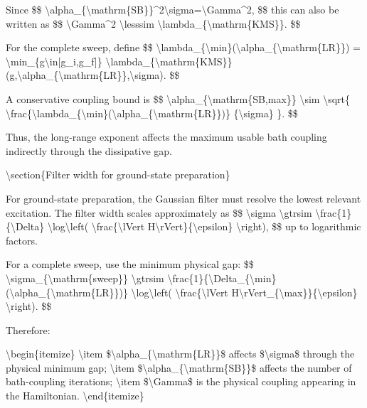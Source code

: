 {Since
\$\$
\textbackslash{}alpha\_\{\textbackslash{}mathrm\{SB\}\}\textasciicircum{}2\textbackslash{}sigma=\textbackslash{}Gamma\textasciicircum{}2,
\$\$
this can also be written as
\$\$
\textbackslash{}Gamma\textasciicircum{}2
\textbackslash{}lesssim
\textbackslash{}lambda\_\{\textbackslash{}mathrm\{KMS\}\}.
\$\$

For the complete sweep, define
\$\$
\textbackslash{}lambda\_\{\textbackslash{}min\}(\textbackslash{}alpha\_\{\textbackslash{}mathrm\{LR\}\})
=
\textbackslash{}min\_\{g\textbackslash{}in[g\_i,g\_f]\}
\textbackslash{}lambda\_\{\textbackslash{}mathrm\{KMS\}\}
(g,\textbackslash{}alpha\_\{\textbackslash{}mathrm\{LR\}\},\textbackslash{}sigma).
\$\$

A conservative coupling bound is
\$\$
\textbackslash{}alpha\_\{\textbackslash{}mathrm\{SB,max\}\}
\textbackslash{}sim
\textbackslash{}sqrt\{
\textbackslash{}frac\{\textbackslash{}lambda\_\{\textbackslash{}min\}(\textbackslash{}alpha\_\{\textbackslash{}mathrm\{LR\}\})\}
\{\textbackslash{}sigma\}
\}.
\$\$

Thus, the long-range exponent affects the maximum usable bath coupling
indirectly through the dissipative gap.

\textbackslash{}section\{Filter width for ground-state preparation\}

For ground-state preparation, the Gaussian filter must resolve the lowest
relevant excitation. The filter width scales approximately as
\$\$
\textbackslash{}sigma
\textbackslash{}gtrsim
\textbackslash{}frac\{1\}\{\textbackslash{}Delta\}
\textbackslash{}log\textbackslash{}left(
\textbackslash{}frac\{\textbackslash{}lVert H\textbackslash{}rVert\}\{\textbackslash{}epsilon\}
\textbackslash{}right),
\$\$
up to logarithmic factors.

For a complete sweep, use the minimum physical gap:
\$\$
\textbackslash{}sigma\_\{\textbackslash{}mathrm\{sweep\}\}
\textbackslash{}gtrsim
\textbackslash{}frac\{1\}\{\textbackslash{}Delta\_\{\textbackslash{}min\}(\textbackslash{}alpha\_\{\textbackslash{}mathrm\{LR\}\})\}
\textbackslash{}log\textbackslash{}left(
\textbackslash{}frac\{\textbackslash{}lVert H\textbackslash{}rVert\_\{\textbackslash{}max\}\}\{\textbackslash{}epsilon\}
\textbackslash{}right).
\$\$

Therefore:

\textbackslash{}begin\{itemize\}
    \textbackslash{}item \$\textbackslash{}alpha\_\{\textbackslash{}mathrm\{LR\}\}\$ affects \$\textbackslash{}sigma\$ through the physical
    minimum gap;
    \textbackslash{}item \$\textbackslash{}alpha\_\{\textbackslash{}mathrm\{SB\}\}\$ affects the number of bath-coupling
    iterations;
    \textbackslash{}item \$\textbackslash{}Gamma\$ is the physical coupling appearing in the Hamiltonian.
\textbackslash{}end\{itemize\}

}
